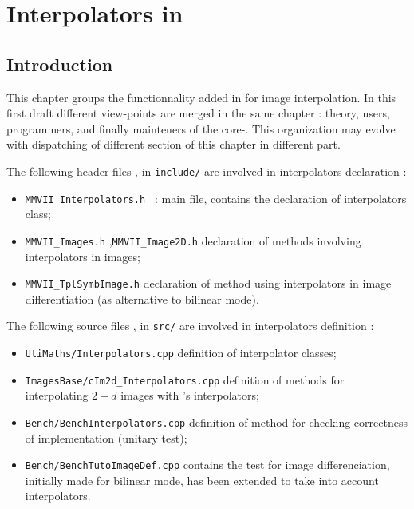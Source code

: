 


\chapter{Interpolators in \PPP}

\label{ChapInterpolators}


\section{Introduction}
This chapter groups the functionnality added in \PPP for image interpolation. In this
first draft different view-points are merged in the same chapter : theory, users, programmers,
and finally mainteners of the core-\PPP.  This organization may evolve with dispatching of different section
of this chapter in different part.

The following header  files , in {\tt include/} are involved in interpolators declaration :

\begin{itemize}
    \item {\tt MMVII\_Interpolators.h } : main file, contains the declaration of interpolators class;
    \item {\tt MMVII\_Images.h} ,{\tt MMVII\_Image2D.h} declaration of methods involving interpolators
          in images;

    \item {\tt MMVII\_TplSymbImage.h}  declaration of method using interpolators in image differentiation
          (as alternative to bilinear mode).
\end{itemize}

The following source  files , in {\tt src/} are involved in interpolators definition :

\begin{itemize}
   \item {\tt UtiMaths/Interpolators.cpp} definition of interpolator classes;
   \item {\tt ImagesBase/cIm2d\_Interpolators.cpp} definition of methods for interpolating $2-d$ images with
         \PPP's interpolators;
   \item {\tt Bench/BenchInterpolators.cpp}  definition of method for checking correctness of implementation
         (unitary test);

   \item {\tt Bench/BenchTutoImageDef.cpp} contains the test for image differenciation, initially made for bilinear mode,
         has been extended to take into account  interpolators.
\end{itemize}


